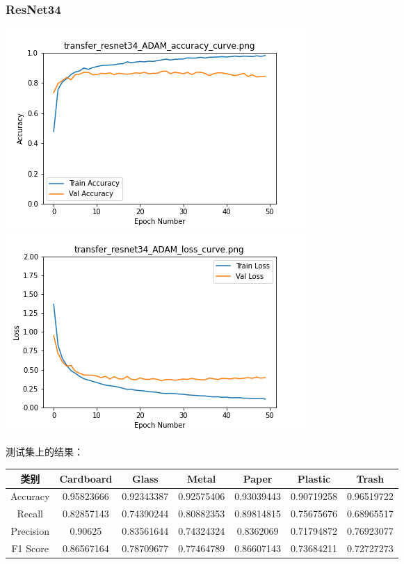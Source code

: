 \documentclass[UTF8]{ctexart}
\begin{document}
\subsubsection{ResNet34}
 \includegraphics[scale=0.5]{image/transfer_resnet34_ADAM_accuracy_curve.png} 
\includegraphics[scale=0.5]{image/transfer_resnet34_ADAM_loss_curve.png} 


测试集上的结果：

\begin{tabular}{|c|c|c|c|c|c|c|}
\hline 
类别 & Cardboard & Glass & Metal & Paper & Plastic & Trash \\ 
\hline 
Accuracy &0.95823666& 0.92343387& 0.92575406& 0.93039443& 0.90719258& 0.96519722\\
 \hline 
Recall &0.82857143& 0.74390244& 0.80882353& 0.89814815& 0.75675676& 0.68965517\\ 
\hline 
Precision &0.90625   & 0.83561644 &0.74324324& 0.8362069 & 0.71794872& 0.76923077  \\ 
\hline 
F1 Score &0.86567164& 0.78709677& 0.77464789& 0.86607143& 0.73684211& 0.72727273 \\ 
\hline 
\end{tabular}
\end{document}
